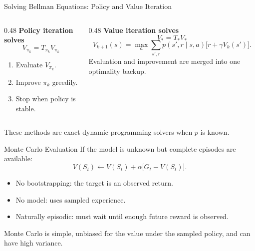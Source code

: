 \documentclass[aspectratio=169]{beamer}
\begin{document}
\begin{frame}{Solving Bellman Equations: Policy and Value Iteration}
\small
\begin{columns}[T,onlytextwidth]
\begin{column}{0.48\textwidth}
\textbf{Policy iteration solves}
\[
V_{\pi_k}=T_{\pi_k}V_{\pi_k}
\]
\begin{enumerate}
    \item Evaluate $V_{\pi_k}$.
    \item Improve $\pi_k$ greedily.
    \item Stop when policy is stable.
\end{enumerate}
\end{column}
\begin{column}{0.48\textwidth}
\textbf{Value iteration solves}
\[
V_*=T_*V_*
\]
\[
V_{k+1}(s)=\max_a\sum_{s',r}p(s',r\mid s,a)
\bigl[r+\gamma V_k(s')\bigr].
\]
Evaluation and improvement are merged into one optimality backup.
\end{column}
\end{columns}

\vspace{0.8em}
These methods are exact dynamic programming solvers when $p$ is known.
\end{frame}

\begin{frame}{Monte Carlo Evaluation}
\small
If the model is unknown but complete episodes are available:
\[
V(S_t)\leftarrow V(S_t)+\alpha\bigl[G_t-V(S_t)\bigr].
\]

\begin{itemize}
    \item No bootstrapping: the target is an observed return.
    \item No model: uses sampled experience.
    \item Naturally episodic: must wait until enough future reward is observed.
\end{itemize}

\vspace{0.6em}
Monte Carlo is simple, unbiased for the value under the sampled policy, and can have high variance.
\end{frame}
\end{document}

